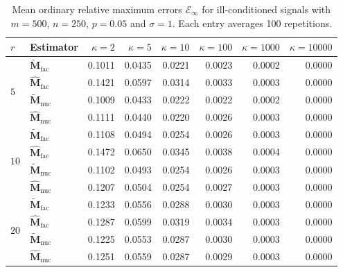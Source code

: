\documentclass[numsec,webpdf,modern,large,namedate]{oup-authoring-template}
\theoremstyle{plain}
\theoremstyle{remark}
\newcommand{\M}{\bm{M}}
\begin{document}
\begin{table}[!htbp]
\centering
\caption{Mean ordinary relative maximum errors $\mathcal E_\infty$ for ill-conditioned signals with $m=500$, $n=250$, $p=0.05$ and $\sigma=1$. Each entry averages 100 repetitions.}
\label{tab:supp:ill_maxnorm}
\begingroup
\small
{}
\setlength{\tabcolsep}{3.2pt}
\begin{tabular}{@{}llrrrrrr@{}}
\toprule
$r$ & Estimator & $\kappa=2$ & $\kappa=5$ & $\kappa=10$ & $\kappa=100$ & $\kappa=1000$ & $\kappa=10000$ \\
\midrule
\multirow{4}{*}{$5$} & $\widetilde{\M}_{\mathrm{fac}}$ & 0.1011 & 0.0435 & 0.0221 & 0.0023 & 0.0002 & 0.0000 \\
 & $\widehat{\M}_{\mathrm{fac}}$ & 0.1421 & 0.0597 & 0.0314 & 0.0033 & 0.0003 & 0.0000 \\
 & $\widetilde{\M}_{\mathrm{nuc}}$ & 0.1009 & 0.0433 & 0.0222 & 0.0022 & 0.0002 & 0.0000 \\
 & $\widehat{\M}_{\mathrm{nuc}}$ & 0.1111 & 0.0440 & 0.0220 & 0.0026 & 0.0003 & 0.0000 \\
\midrule
\multirow{4}{*}{$10$} & $\widetilde{\M}_{\mathrm{fac}}$ & 0.1108 & 0.0494 & 0.0254 & 0.0026 & 0.0003 & 0.0000 \\
 & $\widehat{\M}_{\mathrm{fac}}$ & 0.1472 & 0.0650 & 0.0345 & 0.0038 & 0.0004 & 0.0000 \\
 & $\widetilde{\M}_{\mathrm{nuc}}$ & 0.1102 & 0.0493 & 0.0254 & 0.0026 & 0.0003 & 0.0000 \\
 & $\widehat{\M}_{\mathrm{nuc}}$ & 0.1207 & 0.0504 & 0.0254 & 0.0027 & 0.0003 & 0.0000 \\
\midrule
\multirow{4}{*}{$20$} & $\widetilde{\M}_{\mathrm{fac}}$ & 0.1233 & 0.0556 & 0.0288 & 0.0030 & 0.0003 & 0.0000 \\
 & $\widehat{\M}_{\mathrm{fac}}$ & 0.1287 & 0.0599 & 0.0319 & 0.0034 & 0.0003 & 0.0000 \\
 & $\widetilde{\M}_{\mathrm{nuc}}$ & 0.1225 & 0.0553 & 0.0287 & 0.0030 & 0.0003 & 0.0000 \\
 & $\widehat{\M}_{\mathrm{nuc}}$ & 0.1251 & 0.0559 & 0.0287 & 0.0029 & 0.0003 & 0.0000 \\
\bottomrule
\end{tabular}
\endgroup
\end{table}
\end{document}
